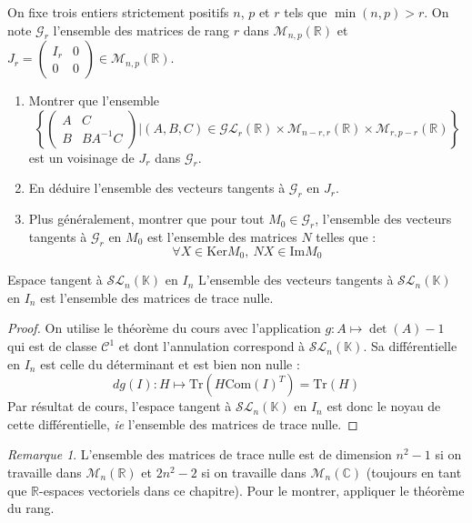 \documentclass[french,a4paper]{article}
\newcommand{\R}{\mathbb{R}}
\newcommand{\C}{\mathbb{C}}
\newcommand{\K}{\mathbb{K}}
\newcommand{\inv}{^{-1}}
\renewcommand{\ker}{\text{Ker}}
\newcommand{\Tr}{\text{Tr}}
\theoremstyle{plain}
\theoremstyle{definition}
\theoremstyle{remark}
\newtheorem*{rmq}{Remarque}
\begin{document}
\begin{ex}[Moulin.CD.65]{}
	On fixe trois entiers strictement positifs $n$, $p$ et $r$ tels que $\min(n,p)>r$. On note $\mathcal{G}_r$ l'ensemble des matrices de rang $r$ dans $\mathcal{M}_{n,p}(\R)$ et $J_r=\displaystyle\begin{pmatrix}
		I_r&0\\
		0&0
	\end{pmatrix}\in\mathcal{M}_{n,p}(\R)$.
	\begin{enumerate}
		\item Montrer que l'ensemble $$\left\{\begin{pmatrix}
			A&C\\
			B&BA\inv C
		\end{pmatrix}\bigg| (A,B,C)\in\mathcal{GL}_r(\R)\times\mathcal{M}_{n-r,r}(\R)\times\mathcal{M}_{r,p-r}(\R)\right\}$$ est un voisinage de $J_r$ dans $\mathcal{G}_r$.
		\item En déduire l'ensemble des vecteurs tangents à $\mathcal{G}_r$ en $J_r$.
		\item Plus généralement, montrer que pour tout $M_0\in\mathcal{G}_r$, l'ensemble des vecteurs tangents à $\mathcal{G}_r$ en $M_0$ est l'ensemble des matrices $N$ telles que : $$\forall X\in\ker M_0,\ NX\in\text{Im}M_0$$
	\end{enumerate}
\end{ex}

\begin{ex}[Moulin.CD.66]{Espace tangent à $\mathcal{SL}_n(\K)$ en $I_n$}
	L'ensemble des vecteurs tangents à $\mathcal{SL}_n(\K)$ en $I_n$ est l'ensemble des matrices de trace nulle.
\end{ex}
\begin{proof}
	On utilise le théorème du cours avec l'application $g:A\mapsto\det(A)-1$ qui est de classe $\mathcal{C}^1$ et dont l'annulation correspond à $\mathcal{SL}_n(\K)$. Sa différentielle en $I_n$ est celle du déterminant et est bien non nulle : $$dg(I):H\mapsto\Tr(H\text{Com}(I)^T)=\Tr(H)$$ Par résultat de cours, l'espace tangent à $\mathcal{SL}_n(\K)$ en $I_n$ est donc le noyau de cette différentielle, \textit{ie} l'ensemble des matrices de trace nulle.
\end{proof}
\begin{rmq}
	L'ensemble des matrices de trace nulle est de dimension $n^2-1$ si on travaille dans $\mathcal{M}_n(\R)$ et $2n^2-2$ si on travaille dans $\mathcal{M}_n(\C)$ (toujours en tant que $\R$-espaces vectoriels dans ce chapitre). Pour le montrer, appliquer le théorème du rang.
\end{rmq}
\end{document}
